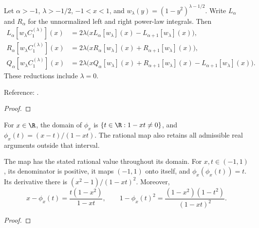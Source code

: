 \begin{supporting}
\begin{theorem}
\label{thm:power-law-first-mode}
\leanok
Let $\alpha>-1$, $\lambda>-1/2$, $-1<x<1$, and
$w_\lambda(y)=(1-y^2)^{\lambda-1/2}$. Write $L_\alpha$ and $R_\alpha$
for the unnormalized left and right power-law integrals. Then
\begin{align*}
 L_\alpha[w_\lambda C_1^{(\lambda)}](x)
 &=2\lambda\bigl(xL_\alpha[w_\lambda](x)-L_{\alpha+1}[w_\lambda](x)\bigr),\\
 R_\alpha[w_\lambda C_1^{(\lambda)}](x)
 &=2\lambda\bigl(xR_\alpha[w_\lambda](x)+R_{\alpha+1}[w_\lambda](x)\bigr),\\
 Q_\alpha[w_\lambda C_1^{(\lambda)}](x)
 &=2\lambda\bigl(xQ_\alpha[w_\lambda](x)+R_{\alpha+1}[w_\lambda](x)
       -L_{\alpha+1}[w_\lambda](x)\bigr).
\end{align*}
These reductions include $\lambda=0$.

Reference: \cite[Lemma 2.3]{gutleb-carrillo-olver}.
\end{theorem}
\begin{proof}
\leanok
\end{proof}


\begin{definition}
\label{def:power-law-mobius}
\leanok
For $x\in\R$, the domain of $\phi_x$ is $\{t\in\R:1-xt\ne0\}$, and
$\phi_x(t)=(x-t)/(1-xt)$.
The rational map also retains all admissible real arguments outside that interval.
\end{definition}
\begin{theorem}
\label{thm:power-law-mobius-domain}
\leanok
The map has the stated rational value throughout its domain. For $x,t\in(-1,1)$,
its denominator is positive, it maps $(-1,1)$ onto itself, and
$\phi_x(\phi_x(t))=t$. Its derivative there is
$(x^2-1)/(1-xt)^2$. Moreover,
\[
 x-\phi_x(t)=\frac{t(1-x^2)}{1-xt},\qquad
 1-\phi_x(t)^2=\frac{(1-x^2)(1-t^2)}{(1-xt)^2}.
\]
\end{theorem}
\begin{proof}
\leanok
\end{proof}


\end{supporting}
